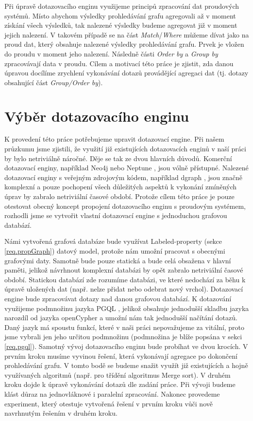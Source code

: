 Při úpravě dotazovacího enginu využijeme principů zpracování dat proudových systémů.
Místo abychom výsledky prohledávání grafu agregovali až v moment získání všech výsledků, tak nalezené výsledky budeme agregovat již v moment jejich nalezení.
V takovém případě se na část \textit{Match}/\textit{Where} můžeme dívat jako na proud dat, který obsahuje nalezené výsledky prohledávání grafu.
Prvek je vložen do proudu v moment jeho nalezení.
Následně části \textit{Order by} a \textit{Group by} zpracovávají data v proudu.
Cílem a motivací této práce je zjistit, zda danou úpravou docílíme zrychlení vykonávání dotazů provádějící agregaci dat (tj. dotazy obsahující část \textit{Group/Order by}).

\section*{Výběr dotazovacího enginu}

K provedení této práce potřebujeme upravit dotazovací engine.
Při našem průzkumu jsme zjistili, že využití již existujících dotazovacích enginů v naší práci by bylo netriviálně náročné.
Děje se tak ze dvou hlavních důvodů.
Komerční dotazovací enginy, například Neo4j \citep{neopropertygraph} nebo Neptune \citep{neptune}, jsou vólně přístupné.
Nalezené dotazovací enginy s veřejným zdrojovým kódem, například dgraph \citep{dgraph}, jsou značně komplexní a pouze pochopení všech důležitých aspektů k vykonání zmíněných úprav by zabralo netriviální časové období.
Protože cílem této práce je pouze otestovat obecný koncept propojení dotazovacího enginu s proudovým systémem, rozhodli jsme se vytvořit vlastní dotazovací engine s jednoduchou grafovou databází.

Námi vytvořená grafová databáze bude využívat Labeled-property (sekce \ref{req.propGraph}) datový model, protože nám umožní pracovat s obecnými grafovými daty.
Samotně bude pouze statická a bude celá obsažena v hlavní paměti, jelikož návrhnout komplexní databázi by opět zabralo netriviální časové období.
Statickou databází zde rozumíme databázi, ve které nedochází za běhu k úpravě uložených dat (např. nelze přidat nebo odebrat nový vrchol).
Dotazovací engine bude zpracovávat dotazy nad danou grafovou databází.
K dotazování využijeme podmnožinu jazyka PGQL \citep{pgql}, jelikož obsahuje jednodušší skladbu jazyka narozdíl od jazyka openCypher \citep{openCypher} a umožní nám tak jednodušší načítání dotazů.
Daný jazyk má spoustu funkcí, které v naši práci nepovažujeme za vitální, proto jsme vybrali jen jeho určitou podmnožinu (podmnožina je blíže popsána v sekci \ref{req.pgql}).
Samotný vývoj dotazovacího enginu bude probíhat ve dvou krocích.
V prvním kroku musíme vyvinou řešení, která vykonávají agregace po dokončení prohledávání grafu.
V tomto bodě se budeme snažit využít již existujících a hojně využívaných algoritmů (např. pro třídění algoritmus Merge sort). 
V druhém kroku dojde k úpravě vykonávání dotazů dle zadání práce.
Při vývoji budeme klást důraz na jednovláknové i paralelní zpracování.
Nakonec provedeme experiment, který otestuje vytvořená řešení v prvním kroku vůči nově navrhnutým řešením v druhém kroku.

